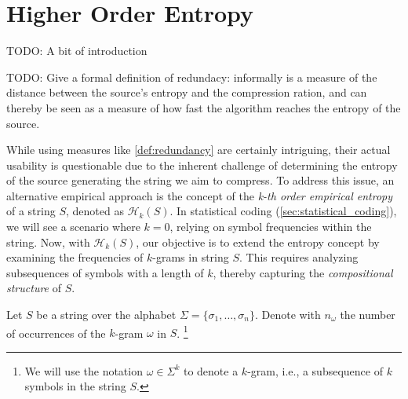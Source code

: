 \clearpage
\section{Higher Order Entropy} \label{sec:higher_order_entropy}

TODO: A bit of introduction
\begin{definition}[Redundacy] \label{def:redundancy}
    TODO: Give a formal definition of redundacy: informally is a measure of the distance between the source's entropy and the compression ration, and can thereby be seen as a measure of how fast the algorithm reaches the entropy of the source.
\end{definition}


\noindent While using measures like \ref{def:redundancy} are certainly intriguing, their actual usability is questionable due to the inherent challenge of determining the entropy of the source generating the string we aim to compress. To address this issue, an alternative empirical approach is the concept of the \emph{k-th order empirical entropy} of a string $S$, denoted as $\mathcal{H}_k(S)$. In statistical coding (\autoref{sec:statistical_coding}), we will see a scenario where $k=0$, relying on symbol frequencies within the string. Now, with $\mathcal{H}_k(S)$, our objective is to extend the entropy concept by examining the frequencies of $k$-grams in string $S$. This requires analyzing subsequences of symbols with a length of $k$, thereby capturing the \emph{compositional structure} of $S$. \cite{ferragina2023pearls} \vspace{0.4cm}

\noindent Let $S$ be a string over the alphabet $\Sigma=\{\sigma_1, \dots, \sigma_n\}$. Denote with $n_\omega$ the number of occurrences of the $k$-gram $\omega$ in $S$. \footnote{We will use the notation $\omega \in \Sigma^k$ to denote a $k$-gram, i.e., a subsequence of $k$ symbols in the string $S$.}

